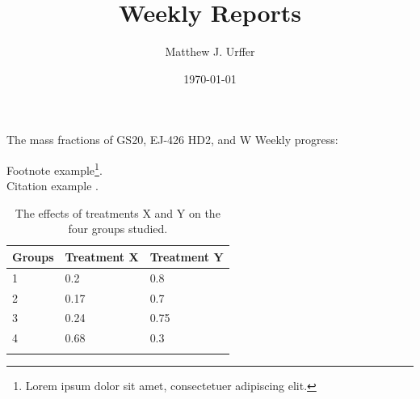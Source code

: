 \documentclass[paper=a4,twoside,captions=tableheading,index=totoc,hyperref]{labbook}
\begin{document}
\title{Weekly Reports}
\author{Matthew J. Urffer}
\date{\today}
\maketitle

\listoftodos
\printnomenclature
\printindex
\tableofcontents
\listoffigures
\listoftables
\lstlistoflistings

\newpage %

\pagestyle{scrheadings} %



The mass fractions of GS20, EJ-426 HD2, and W
Weekly progress:

\lipsum[1]



\lipsum[2]

Footnote example\footnote{Lorem ipsum dolor sit amet, consectetuer adipiscing elit.}.\\

Citation example \cite{lamport94}.



\lipsum[3]

\begin{table}
\label{tab:treatments_xy}
\raggedleft
\begin{tabular}{l l l}
\toprule
\textbf{Groups} & \textbf{Treatment X} & \textbf{Treatment Y} \\
\toprule
1 & 0.2 & 0.8\\
2 & 0.17 & 0.7\\
3 & 0.24 & 0.75\\
4 & 0.68 & 0.3\\
\bottomrule\\
\end{tabular}
\caption{The effects of treatments X and Y on the four groups studied.}
\end{table}
\end{document}
